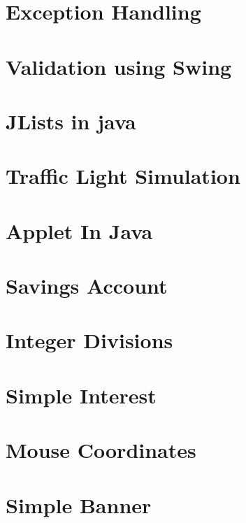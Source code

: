 \documentclass{article}
\begin{document}
\section{Exception Handling}

\newpage

\section{Validation using Swing}

\newpage

\section{JLists in java}

\newpage

\section{Traffic Light Simulation}

\newpage

\section{Applet In Java}

\newpage

\section{Savings Account}

\newpage

\section{Integer Divisions}

\newpage

\section{Simple Interest}

\newpage

\section{Mouse Coordinates}

\newpage

\section{Simple Banner}

\newpage
\end{document}
